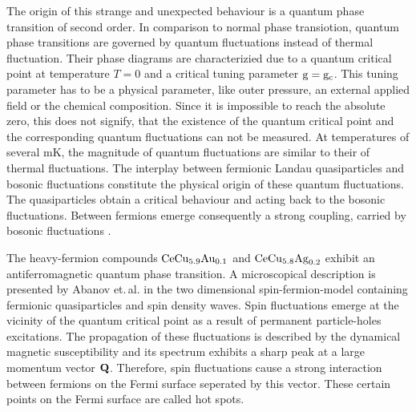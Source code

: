 The origin of this strange and unexpected behaviour is a quantum phase transition of second order.
In comparison to normal phase transiotion, quantum phase transitions are governed by quantum fluctuations instead of thermal fluctuation.
Their phase diagrams are characterizied due to a quantum critical point at temperature $T=0$ and a critical tuning parameter $\mathrm{g}=\mathrm{g}_{\mathrm{c}}$.
This tuning parameter has to be a physical parameter, like outer  pressure, an external applied field or the chemical composition.
Since it is impossible to reach the absolute zero, this does not signify, that the existence of the quantum critical point and the corresponding quantum fluctuations can not be measured.
At temperatures of several mK, the magnitude of quantum fluctuations are similar to their of thermal fluctuations.
The interplay between fermionic Landau quasiparticles and bosonic fluctuations constitute the physical origin of these quantum fluctuations.
The quasiparticles obtain a critical behaviour and acting back to the bosonic fluctuations.
Between fermions emerge consequently a strong coupling, carried by bosonic fluctuations \cite{Abrahams&Schmalian&Woelfle}.

The heavy-fermion compounds $\mathrm{CeCu}_{5.9}\mathrm{Au}_{0.1}$ and $\mathrm{CeCu}_{5.8}\mathrm{Ag}_{0.2}$ exhibit an antiferromagnetic quantum phase transition.
A microscopical description is presented by Abanov et.\,al. \cite{Abanov&Chubukov&Schmalian} in the two dimensional spin-fermion-model containing fermionic quasiparticles and spin density waves.
Spin fluctuations emerge at the vicinity of the quantum critical point as a result of permanent particle-holes excitations.
The propagation of these fluctuations is described by the dynamical magnetic susceptibility and its spectrum exhibits a sharp peak at a large momentum vector $\vb{Q}$.
Therefore, spin fluctuations cause a strong interaction between fermions on the Fermi surface seperated by this vector.
These certain points on the Fermi surface are called hot spots.

